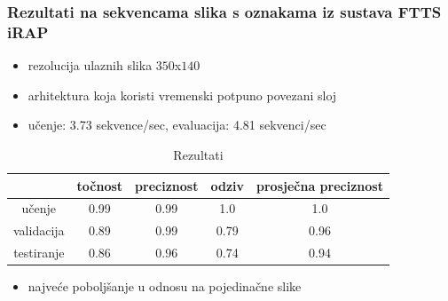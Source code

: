 \documentclass{beamer}
\begin{document}
\begin{frame}
 \frametitle{Rezultati na sekvencama slika s oznakama iz sustava FTTS iRAP}
 \begin{itemize}
  \item rezolucija ulaznih slika $350$x$140$
  \item arhitektura koja koristi vremenski potpuno povezani sloj
  \item učenje: 3.73 sekvence/sec, evaluacija: 4.81 sekvenci/sec
 \end{itemize}
 
\begin{table}[H]
\centering
\caption{Rezultati}
\label{score:temporal}
\begin{tabular}{c|c|c|c|c|}
\cline{2-5}
                                            & točnost & preciznost & odziv & prosječna preciznost \\ \hline
\multicolumn{1}{|c|}{učenje}     & 0.99       & 0.99        & 1.0     &           1.0           \\ \hline
\multicolumn{1}{|c|}{validacija} & 0.89       & 0.99        & 0.79     &            0.96          \\ \hline
\multicolumn{1}{|c|}{testiranje} & 0.86       & 0.96        & 0.74     &            0.94          \\ \hline
\end{tabular}
\end{table}

\begin{itemize}
 \item najveće poboljšanje u odnosu na pojedinačne slike
\end{itemize}


\end{frame}
\end{document}
